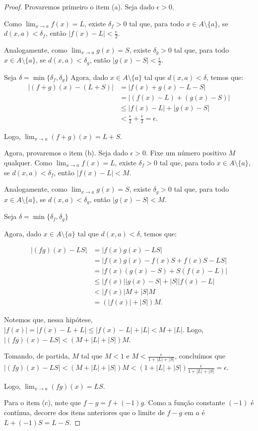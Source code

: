 \begin{proof}
    Provaremos primeiro o item (a).
    Seja dado $\epsilon>0$.

    Como $\lim_{x\to a} f(x) = L$, existe $\delta_f>0$ tal que, para todo $x \in A\setminus\{a\}$, se $d(x, a) < \delta_f$, então $|f(x) - L| < \frac{\epsilon}{2}$.

    Analogamente, como $\lim_{x\to a} g(x) = S$, existe $\delta_g>0$ tal que, para todo $x \in A\setminus\{a\}$, se $d(x, a) < \delta_g$, então $|g(x) - S| < \frac{\epsilon}{2}$.

    Seja $\delta = \min\{\delta_f, \delta_g\}$
    Agora, dado $x \in A\setminus\{a\}$ tal que $d(x, a) < \delta$, temos que:
    \begin{align*}
        |(f+g)(x) - (L + S)| &= |f(x) + g(x) - L - S| \\
        &= |(f(x) - L) + (g(x) - S)| \\
        &\leq |f(x) - L| + |g(x) - S| \\
        &< \frac{\epsilon}{2} + \frac{\epsilon}{2} = \epsilon.
    \end{align*}
      
    Logo, $\lim_{x\to a} (f+g)(x) = L + S$.

    Agora, provaremos o item (b).
    Seja dado $\epsilon>0$. Fixe um número positivo $M$ qualquer.
    Como $\lim_{x\to a} f(x) = L$, existe $\delta_f>0$ tal que, para todo $x \in A\setminus\{a\}$, se $d(x, a) < \delta_f$, então $|f(x) - L| < M$.

    Analogamente, como $\lim_{x\to a} g(x) = S$, existe $\delta_g>0$ tal que, para todo $x \in A\setminus\{a\}$, se $d(x, a) < \delta_g$, então $|g(x) - S| < M$.

    Seja $\delta = \min\{\delta_f, \delta_g\}$

    Agora, dado $x \in A\setminus\{a\}$ tal que $d(x, a) < \delta$, temos que:

    \begin{align*}
        |(fg)(x) - LS| &= |f(x)g(x) - LS| \\
        &= |f(x)g(x) - f(x)S + f(x)S - LS| \\
        &= |f(x)(g(x) - S) + S(f(x) - L)| \\
        &\leq |f(x)||g(x) - S| + |S||f(x) - L| \\
        &< |f(x)|M + |S|M \\
        &= (|f(x)| + |S|)M.
    \end{align*}

    Notemos que, nessa hipótese, $|f(x)|=|f(x) - L + L| \leq |f(x) - L| + |L| < M + |L|$.
    Logo, $|(fg)(x) - LS| < (M + |L| + |S|)M$.

    Tomando, de partida, $M$ tal que $M<1$ e $M < \frac{\epsilon}{1 + |L| + |S|}$, concluímos que $|(fg)(x) - LS| < (M + |L| + |S|)M<(1+|L|+|S|)\frac{\epsilon}{1 + |L| + |S|}=\epsilon$.

    Logo, $\lim_{x\to a} (fg)(x) = LS$.

    Para o item (c), note que $f-g = f + (-1)g$.
    Como a função constante $(-1)$ é contínua, decorre dos itens anteriores que o limite de $f-g$ em $a$ é $L +(-1)S = L - S$.
\end{proof}


